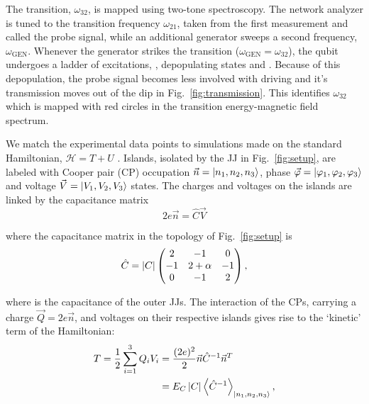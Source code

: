 The \ilra{}  transition, $\omega_{32}$, is  mapped using two-tone  spectroscopy.  The
network  analyzer is  tuned to  the transition  frequency  $ \omega_{21}  $, taken  from the  first
measurement  and called  the  probe signal,  while  an additional  generator  sweeps a  second
frequency,  $  \omega_{\text{GEN}} $.   Whenever  the  generator strikes  the  \ira{}
transition ($\omega_{\text{GEN}} = \omega_{32} $), the qubit undergoes a ladder of excitations, 
    ,  depopulating  states    and
.  Because of  this depopulation, the probe signal becomes  less involved with driving
and it's  transmission moves out of  the dip in Fig.~\ref{fig:transmission}.   This identifies
$\omega_{32}$ which is mapped with red circles in the transition energy-magnetic field spectrum.


We  match the  experimental  data points  to  simulations made  on  the standard  Hamiltonian,
$  \mathcal{H}   =  T   +  U   $  \cite{orlando1999}.    Islands,  isolated   by  the   JJ  in
Fig.~\ref{fig:setup},     are     labeled     with     Cooper     pair     (CP)     occupation
$         \vec{n}        =         \Ket{n_1,        n_2,         n_3}        $,         phase
$       \vec{\varphi}       =       \Ket{\varphi_1,       \varphi_2,       \varphi_3}       $       and       voltage
$ \vec{V} = \Ket{V_{1}, V_{2}, V_{3}} $ states.   The charges and voltages on the islands are
linked by the capacitance matrix
\begin{equation}
  \label{eq:link}
  2e\vec{n} = \hat{C}\vec{V}
\end{equation}

\noindent where the capacitance matrix in the topology of Fig.~\ref{fig:setup} is
\begin{equation}
  \label{eq:capac}
  \hat{C} = \left|C\right| \begin{pmatrix}
    2  &  -1  &  0\\
    -1  &  2  +  \alpha  &  -1\\
    0  &  -1  & 2
  \end{pmatrix},
\end{equation}

\noindent where   is the capacitance  of the outer  JJs.  The interaction of  the CPs,
carrying a charge $  \vec{Q}=2e\vec{n} $, and voltages on their  respective islands gives rise
to the `kinetic' term of the Hamiltonian:
\begin{equation}\label{eq:kinetic}
  \begin{aligned}
    T = \frac{1}{2}\sum_{i=1}^{3}Q_iV_i & =
    \frac{(2e)^2}{2}\vec{n}\hat{C}^{-1}\vec{n}^{T}\\
    & = E_C \left|C\right| \left\langle \hat{C}^{-1} \right\rangle_{\Ket{n_{1}, n_2, n_3}},
  \end{aligned}
\end{equation}


